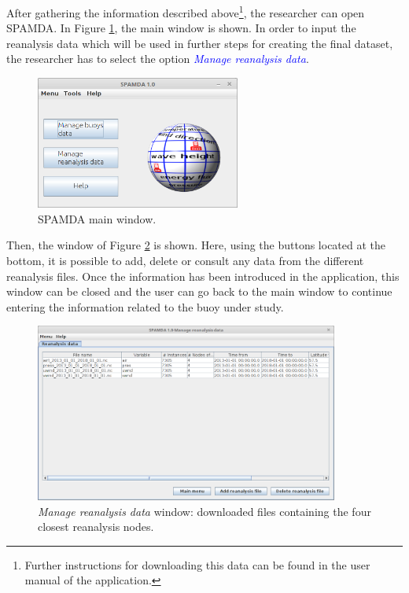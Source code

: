 \documentclass[review]{elsarticle}
\begin{document}
			After gathering the information described above\footnote{Further instructions for downloading this data can be found in the user manual of the application.}, the researcher can open SPAMDA. In Figure \ref{fig:main_view}, the main window is shown. In order to input the reanalysis data which will be used in further steps for creating the final dataset, the researcher has to select the option \textcolor{blue}{\textit{Manage reanalysis data}}.
		
			\begin{figure}[ht]
				\centering
				\includegraphics[width=0.60\textwidth]{figures/FigureMain_view.png}
				\caption{SPAMDA main window.}\label{fig:main_view}
			\end{figure}
			
			Then, the window of Figure \ref{fig:reanalysis} is shown. Here, using the buttons located at the bottom, it is possible to add, delete or consult any data from the different reanalysis files. Once the information has been introduced in the application, this window can be closed and the user can go back to the main window to continue entering the information related to the buoy under study. 
			
			\begin{figure}[ht!]
				\centering
				\includegraphics[width=0.89\textwidth]{figures/FigureManage_reanalysis_data.png}
				\caption{\textit{Manage reanalysis data} window: downloaded files containing the four closest reanalysis nodes.}\label{fig:reanalysis}
			\end{figure}
		
\end{document}
